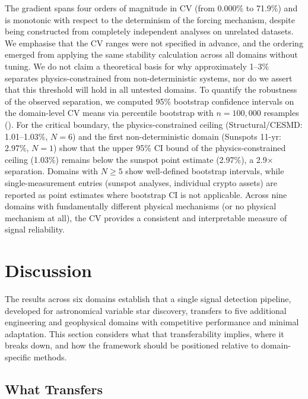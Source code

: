 \documentclass[11pt,a4paper]{article}
\begin{document}
The gradient spans four orders of magnitude in CV (from 0.000\% to 71.9\%) and is monotonic with respect to the determinism of the forcing mechanism, despite being constructed from completely independent analyses on unrelated datasets. We emphasise that the CV ranges were not specified in advance, and the ordering emerged from applying the same stability calculation across all domains without tuning. We do not claim a theoretical basis for why approximately 1--3\% separates physics-constrained from non-deterministic systems, nor do we assert that this threshold will hold in all untested domains. To quantify the robustness of the observed separation, we computed 95\% bootstrap confidence intervals on the domain-level CV means via percentile bootstrap with $n = 100{,}000$ resamples (). For the critical boundary, the physics-constrained ceiling (Structural/CESMD: 1.01--1.03\%, $N=6$) and the first non-deterministic domain (Sunspots 11-yr: 2.97\%, $N=1$) show that the upper 95\% CI bound of the physics-constrained ceiling (1.03\%) remains below the sunspot point estimate (2.97\%), a 2.9$\times$ separation. Domains with $N \geq 5$ show well-defined bootstrap intervals, while single-measurement entries (sunspot analyses, individual crypto assets) are reported as point estimates where bootstrap CI is not applicable. Across nine domains with fundamentally different physical mechanisms (or no physical mechanism at all), the CV provides a consistent and interpretable measure of signal reliability.


\section{Discussion}
\label{sec:discussion}

The results across six domains establish that a single signal detection pipeline, developed for astronomical variable star discovery, transfers to five additional engineering and geophysical domains with competitive performance and minimal adaptation. This section considers what that transferability implies, where it breaks down, and how the framework should be positioned relative to domain-specific methods.

\subsection{What Transfers}
\label{sec:transfers}
\end{document}
